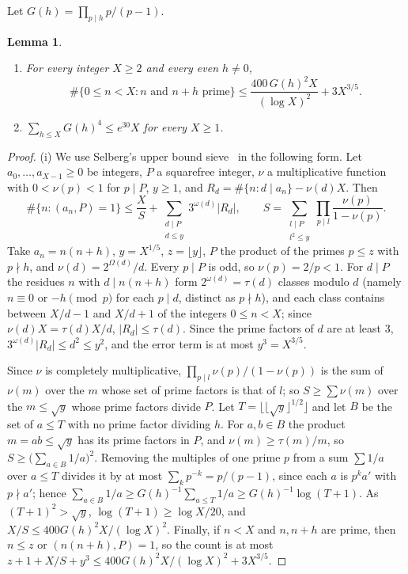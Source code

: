 \documentclass[12pt]{amsart}
\newtheorem{lemma}[theorem]{Lemma}
\theoremstyle{remark}
\begin{document}
Let $G(h)=\prod_{p\mid h}p/(p-1)$.

\begin{lemma}\label{lem:pairs}
\begin{enumerate}
\item[(i)] For every integer $X\ge2$ and every even $h\ne0$,
\[
  \#\{0\le n<X:n\text{ and }n+h\text{ prime}\}\le\frac{400\,G(h)^2X}{(\log X)^2}+3X^{3/5}.
\]
\item[(ii)] $\sum_{h\le X}G(h)^4\le e^{30}X$ for every $X\ge1$.
\end{enumerate}
\end{lemma}

\begin{proof}
(i) We use Selberg's upper bound sieve~\cite[Ch.~3]{HR74} in the following form. Let
$a_0,\dots,a_{X-1}\ge0$ be integers, $P$ a squarefree integer, $\nu$ a multiplicative function with
$0<\nu(p)<1$ for $p\mid P$, $y\ge1$, and $R_d=\#\{n:d\mid a_n\}-\nu(d)X$. Then
\[
  \#\{n:(a_n,P)=1\}\le\frac XS+\sum_{\substack{d\mid P\\d\le y}}3^{\omega(d)}|R_d|,\qquad
  S=\sum_{\substack{l\mid P\\l^2\le y}}\prod_{p\mid l}\frac{\nu(p)}{1-\nu(p)}.
\]
Take $a_n=n(n+h)$, $y=X^{1/5}$, $z=\lfloor y\rfloor$, $P$ the product of the primes $p\le z$ with
$p\nmid h$, and $\nu(d)=2^{\Omega(d)}/d$. Every $p\mid P$ is odd, so $\nu(p)=2/p<1$. For $d\mid P$ the
residues $n$ with $d\mid n(n+h)$ form $2^{\omega(d)}=\tau(d)$ classes modulo $d$ (namely $n\equiv0$ or
$-h\pmod p$ for each $p\mid d$, distinct as $p\nmid h$), and each class contains between $X/d-1$
and $X/d+1$ of the integers $0\le n<X$; since $\nu(d)X=\tau(d)X/d$, $|R_d|\le\tau(d)$. Since the prime factors of $d$ are at least $3$,
$3^{\omega(d)}|R_d|\le d^2\le y^2$, and the error term is at most $y^3=X^{3/5}$.

Since $\nu$ is completely multiplicative, $\prod_{p\mid l}\nu(p)/(1-\nu(p))$ is the sum of $\nu(m)$
over the $m$ whose set of prime factors is that of $l$; so $S\ge\sum\nu(m)$ over the $m\le\sqrt y$
whose prime factors divide $P$. Let $T=\lfloor\lfloor\sqrt y\rfloor^{1/2}\rfloor$ and let $B$ be
the set of $a\le T$ with no prime factor dividing $h$. For $a,b\in B$ the product $m=ab\le\sqrt y$
has its prime factors in $P$, and $\nu(m)\ge\tau(m)/m$, so
$S\ge\bigl(\sum_{a\in B}1/a\bigr)^2$. Removing the multiples of one prime $p$ from a sum
$\sum1/a$ over $a\le T$ divides it by at most $\sum_kp^{-k}=p/(p-1)$, since each $a$ is $p^ka'$ with
$p\nmid a'$; hence $\sum_{a\in B}1/a\ge G(h)^{-1}\sum_{a\le T}1/a\ge G(h)^{-1}\log(T+1)$. As
$(T+1)^2>\sqrt y$, $\log(T+1)\ge\log X/20$, and $X/S\le400G(h)^2X/(\log X)^2$. Finally, if $n<X$
and $n,n+h$ are prime, then $n\le z$ or $(n(n+h),P)=1$, so the count is at most
$z+1+X/S+y^3\le400G(h)^2X/(\log X)^2+3X^{3/5}$.


\end{proof}
\end{document}
